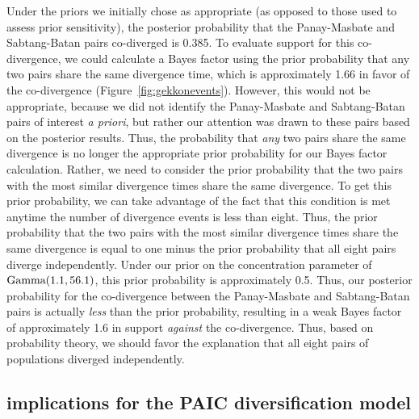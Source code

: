 Under the priors we initially chose as appropriate (as opposed to those used to
assess prior sensitivity), the posterior probability that the Panay-Masbate and
Sabtang-Batan pairs co-diverged is 0.385.
To evaluate support for this co-divergence, we could calculate a Bayes factor
using the prior probability that any two pairs share the same divergence time,
which is approximately 1.66 in favor of the co-divergence
(Figure~\ref{fig:gekkonevents}).
However, this would not be appropriate, because we did not identify the
Panay-Masbate and Sabtang-Batan pairs of interest \emph{a priori},
but rather our attention was drawn to these pairs based on the posterior
results.
Thus, the probability that \emph{any} two pairs share the same divergence
is no longer the appropriate prior probability for our Bayes factor calculation.
Rather, we need to consider the prior probability that the two pairs with
the most similar divergence times share the same divergence.
To get this prior probability, we can take advantage of the fact that this
condition is met anytime the number of divergence events is less than eight.
Thus, the prior probability that the two pairs with the most similar divergence
times share the same divergence is equal to one minus the prior probability
that all eight pairs diverge independently.
Under our prior on the concentration parameter of $\textrm{Gamma}(1.1, 56.1)$,
this prior probability is approximately 0.5.
Thus, our posterior probability for the co-divergence between the Panay-Masbate
and Sabtang-Batan pairs is actually \emph{less} than the prior probability,
resulting in a weak Bayes factor of approximately 1.6 in support \emph{against}
the co-divergence.
Thus, based on probability theory, we should favor the explanation that all
eight pairs of  populations diverged independently.

\subsection{ implications for the PAIC diversification model}


